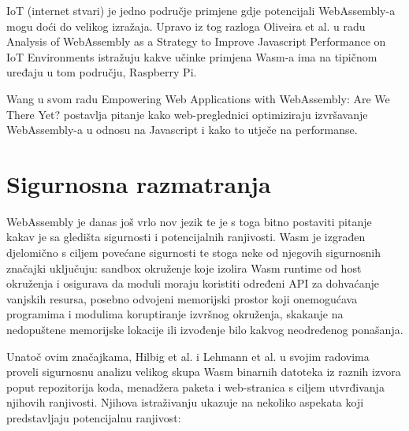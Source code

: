 \documentclass[seminarskirad]{fer}
\begin{document}
IoT (internet stvari) je jedno područje primjene gdje potencijali WebAssembly-a mogu doći do velikog izražaja. Upravo iz tog razloga Oliveira et al. u radu Analysis of WebAssembly as a Strategy to Improve Javascript Performance on IoT Environments istražuju kakve učinke primjena Wasm-a ima na tipičnom uređaju u tom području, Raspberry Pi.

Wang u svom radu Empowering Web Applications with WebAssembly: Are We There Yet? postavlja pitanje kako web-preglednici optimiziraju izvršavanje WebAssembly-a u odnosu na Javascript i kako to utječe na performanse. 
\chapter{Sigurnosna razmatranja}
\label{pog:security}

WebAssembly je danas još vrlo nov jezik te je s toga bitno postaviti pitanje kakav je sa gledišta sigurnosti i potencijalnih ranjivosti. Wasm je izgrađen djelomično s ciljem povećane sigurnosti te stoga neke od njegovih sigurnosnih značajki uključuju: sandbox okruženje koje izolira Wasm runtime od host okruženja i osigurava da moduli moraju koristiti određeni API za dohvaćanje vanjskih resursa, posebno odvojeni memorijski prostor koji onemogućava programima i modulima koruptiranje izvršnog okruženja, skakanje na nedopuštene memorijske lokacije ili izvođenje bilo kakvog neodređenog ponašanja.

Unatoč ovim značajkama, Hilbig et al. i Lehmann et al. u svojim radovima proveli sigurnosnu analizu velikog skupa Wasm binarnih datoteka iz raznih izvora poput repozitorija koda, menadžera paketa i web-stranica s ciljem utvrđivanja njihovih ranjivosti. Njihova istraživanju ukazuje na nekoliko aspekata koji predstavljaju potencijalnu ranjivost:
\end{document}
